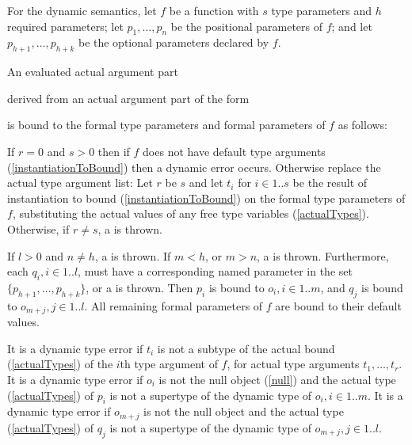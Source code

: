 \documentclass[makeidx]{article}
\begin{document}
{\LMHash{}%
For the dynamic semantics,
let $f$ be a function with $s$ type parameters and $h$ required parameters;
let $p_1, \ldots, p_n$ be the positional parameters of $f$;
and let $p_{h+1}, \ldots, p_{h+k}$ be the optional parameters declared by $f$.

\LMHash{}%
An evaluated actual argument part

\noindent
{}

\noindent
derived from an actual argument part of the form

\noindent
{}

\noindent
is bound to the formal type parameters and formal parameters of $f$ as follows:

\LMHash{}%
If $r = 0$ and $s > 0$ then
if $f$ does not have default type arguments
(\ref{instantiationToBound})
then a dynamic error occurs.
Otherwise replace the actual type argument list:
Let $r$ be $s$ and let $t_i$ for $i \in 1 .. s$ be the result of
instantiation to bound
(\ref{instantiationToBound})
on the formal type parameters of $f$,
substituting the actual values of any free type variables
(\ref{actualTypes}).
Otherwise, if $r \not= s$, a  is thrown.

\LMHash{}%
If $l > 0$ and $n \not= h$, a  is thrown.
If $m < h$, or $m > n$, a  is thrown.
Furthermore, each
$q_i, i \in 1 .. l$,
must have a corresponding named parameter in the set
$\{p_{h+1}, \ldots, p_{h+k}\}$,
or a  is thrown.
Then $p_i$ is bound to
$o_i, i \in 1 .. m$,
and $q_j$ is bound to $o_{m+j}, j \in 1 .. l$.
All remaining formal parameters of $f$ are bound to their default values.


\LMHash{}%
It is a dynamic type error if $t_i$ is not a subtype of the actual bound
(\ref{actualTypes})
of the $i$th type argument of $f$, for actual type arguments $t_1, \ldots, t_r$.
It is a dynamic type error if $o_i$ is not the null object (\ref{null})
and the actual type
(\ref{actualTypes})
of $p_i$ is not a supertype of the dynamic type of $o_i, i \in 1 .. m$.
It is a dynamic type error if $o_{m+j}$ is
not the null object and the actual type
(\ref{actualTypes})
of $q_j$ is not a supertype of the dynamic type of $o_{m+j}, j \in 1 .. l$.


}
\end{document}
